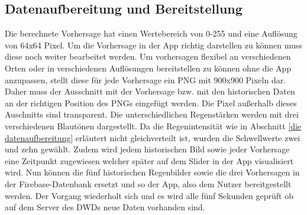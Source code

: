 \subsection{Datenaufbereitung und Bereitstellung}
Die berechnete Vorhersage hat einen Wertebereich von 0-255 und eine Auflösung von 64x64 Pixel.
Um die Vorhersage in der App richtig darstellen zu können muss diese noch weiter bearbeitet werden.
Um vorhersagen flexibel an verschiedenen Orten oder in verschiedenen Auflösungen bereitstellen zu können ohne die App anzupassen, stellt diese für jede Vorhersage ein PNG mit 900x900 Pixeln dar.
Daher muss der Ausschnitt mit der Vorhersage bzw. mit den historischen Daten an der richtigen Position des PNGs eingefügt werden.
Die Pixel außerhalb dieses Auschnitts sind transparent.
Die unterschiedlichen Regenstärken werden mit drei verschiedenen Blautönen dargestellt.
Da die Regenintensität wie in Abschnitt \ref{die datenaufbereitung} erläutert nicht gleichverteilt ist, wurden die Schwellwerte zwei und zehn gewählt. 
Zudem wird jedem historischen Bild sowie jeder Vorhersage eine Zeitpunkt zugewiesen welcher später auf dem Slider in der App visualisiert wird.
Nun können die fünf historischen Regenbilder sowie die drei Vorhersagen in der Firebase-Datenbank ersetzt und so der App, also dem Nutzer bereitgestellt werden. 
Der Vorgang wiederholt sich und es wird alle fünf Sekunden geprüft ob auf dem Server des DWDs neue Daten vorhanden sind. 

